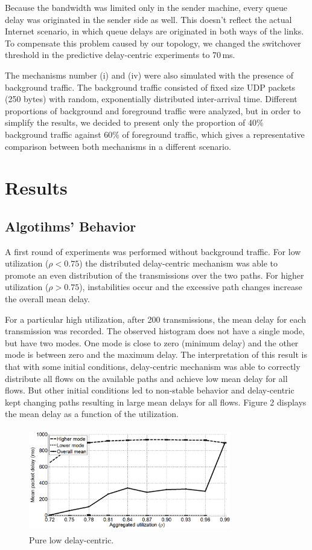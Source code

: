 \documentclass[letterpaper,10pt,oneside,conference,final]{sbrt2015}
\begin{document}
Because the bandwidth was limited only in the sender machine, every queue delay was originated in the sender side as well. This doesn't reflect the actual Internet scenario, in which queue delays are originated in both ways of the links. To compensate this problem caused by our topology, we changed the switchover threshold in the predictive delay-centric experiments to 70\,ms.

The mechanisms number (i) and (iv) were also simulated with the presence of background traffic. The background traffic consisted of fixed size UDP packets (250 bytes) with random, exponentially distributed inter-arrival time. Different proportions of background and foreground traffic were analyzed, but in order to simplify the results, we decided to present only the proportion of 40\% background traffic against 60\% of foreground traffic, which gives a representative comparison between both mechanisms in a different scenario.

\section{Results}
\subsection{Algotihms' Behavior}
  A first round of experiments was performed without background traffic. For low utilization ($\rho < 0.75$) the distributed delay-centric mechanism was able to promote an even distribution of the transmissions over the two paths. For higher utilization ($\rho > 0.75$), instabilities occur and the excessive path changes increase the overall mean delay. 

For a particular high utilization, after 200 transmissions, the mean delay for each transmission was recorded. The observed histogram does not have a single mode, but have two modes. One mode is close to zero (minimum delay) and the other mode is between zero and the maximum delay. The interpretation of this result is that with some initial conditions, delay-centric mechanism was able to correctly distribute all flows on the available paths and achieve low mean delay for all flows. But other initial conditions led to non-stable behavior and delay-centric kept changing paths resulting in large mean delays for all flows. Figure 2 displays the mean delay as a function of the utilization.

\begin{figure}[h!]
\centering
\includegraphics[width=8.8cm,height=4.5cm]{figura2}
\caption{Pure low delay-centric.}
\label{figura2}
\end{figure}
\end{document}
